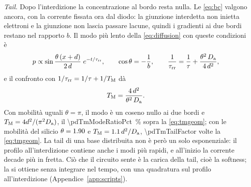 \documentclass[10pt,a4paper]{scrartcl}
\let\newcommand\pdvaluedefine
\newcommand{\taurr}{\tau_\mathrm{rr}}
\newcommand{\TM}{T_\mathrm{M}}
\newcommand{\Da}{D_\mathrm{a}}
\newcommand{\Pp}{p\textsuperscript{+}}
\newcommand{\Nm}{n\textsuperscript{--}}
\newcommand{\Np}{n\textsuperscript{+}}
\begin{document}
\emph{Tail.} Dopo l'interdizione la concentrazione al bordo \Pp{} resta nulla. Le \eqref{eq:bc} valgono ancora, con la corrente fissata ora dal diodo: la giunzione interdetta non inietta elettroni e la giunzione \Nm\Np{} non lascia passare lacune, quindi i gradienti ai due bordi restano nel rapporto $b$. Il modo più lento della \eqref{eq:diffusion} con queste condizioni è
\begin{equation}
p \propto \sin\frac{\theta\,(x+d)}{2\,d}\;e^{-t/\taurr} , \qquad \cos\theta = -\frac1b , \qquad \frac{1}{\taurr} = \frac1\tau + \frac{\theta^2\,\Da}{4\,d^2} ,
\end{equation}
e il confronto con $1/\taurr = 1/\tau + 1/\TM$ dà
\begin{equation}
\TM = \frac{4\,d^2}{\theta^2\,\Da} .
\label{eq:tmtail}
\end{equation}
Con mobilità uguali $\theta = \pi$, il modo è un coseno nullo ai due bordi e $\TM = 4d^2/(\pi^2\Da)$, il \SI{\pdTmModeRatioPct}{\percent} sopra la \eqref{eq:tmgeom}; con le mobilità del silicio $\theta = \num{1.90}$ e $\TM = \num{\pdTmTailCoef}\,d^2/\Da$, \num{\pdTmTailFactor} volte la \eqref{eq:tmgeom}. La tail di una base distribuita non è però un solo esponenziale: il profilo all'interdizione contiene anche i modi più rapidi, e all'inizio la corrente decade più in fretta. Ciò che il circuito sente è la carica della tail, cioè la softness; la si ottiene senza integrare nel tempo, con una quadratura sul profilo all'interdizione (Appendice~\ref{app:scripts}).
\end{document}
